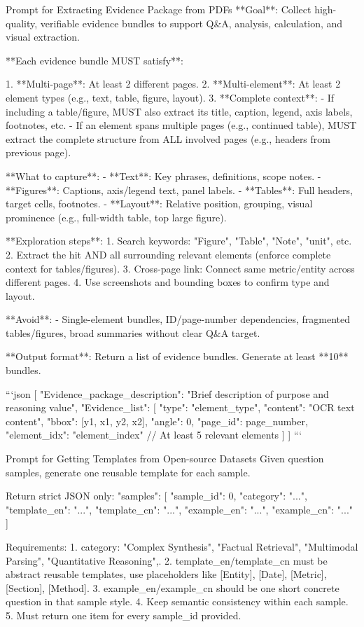 \documentclass[]{opendatalab}
\begin{document}
{{{\begin{promptbox}[breakable]{Prompt for Extracting Evidence Package from PDFs}
**Goal**: Collect high-quality, verifiable evidence bundles to support Q&A, analysis, calculation, and visual extraction.

**Each evidence bundle MUST satisfy**:

1. **Multi-page**: At least 2 different pages.
2. **Multi-element**: At least 2 element types (e.g., text, table, figure, layout).
3. **Complete context**:
 - If including a table/figure, MUST also extract its title, caption, legend, axis labels, footnotes, etc.
 - If an element spans multiple pages (e.g., continued table), MUST extract the complete structure from ALL involved pages (e.g., headers from previous page).

**What to capture**:
- **Text**: Key phrases, definitions, scope notes.
- **Figures**: Captions, axis/legend text, panel labels.
- **Tables**: Full headers, target cells, footnotes.
- **Layout**: Relative position, grouping, visual prominence (e.g., full-width table, top large figure).

**Exploration steps**:
1. Search keywords: "Figure", "Table", "Note", "unit", etc.
2. Extract the hit AND all surrounding relevant elements (enforce complete context for tables/figures).
3. Cross-page link: Connect same metric/entity across different pages.
4. Use screenshots and bounding boxes to confirm type and layout.

**Avoid**:
- Single-element bundles, ID/page-number dependencies, fragmented tables/figures, broad summaries without clear Q&A target.

**Output format**: Return a list of evidence bundles. Generate at least **10** bundles.

```json
[{
 "Evidence_package_description": "Brief description of purpose and reasoning value",
 "Evidence_list": [
 {
 "type": "element_type",
 "content": "OCR text content",
 "bbox": [y1, x1, y2, x2],
 "angle": 0,
 "page_id": page_number,
 "element_idx": "element_index"
 }
 // At least 5 relevant elements
 ]
}]
```
\end{promptbox}

\begin{promptbox}[breakable]{Prompt for Getting Templates from Open-source Datasets}
Given question samples, generate one reusable template for each sample.

Return strict JSON only:
{{
 "samples": [
 {{
 "sample_id": 0,
 "category": "...",
 "template_en": "...",
 "template_cn": "...",
 "example_en": "...",
 "example_cn": "..."
 }}
 ]
}}

Requirements:
1. category: "Complex Synthesis", "Factual Retrieval", "Multimodal Parsing", "Quantitative Reasoning",.
2. template_en/template_cn must be abstract reusable templates, use placeholders like [Entity], [Date], [Metric], [Section], [Method].
3. example_en/example_cn should be one short concrete question in that sample style.
4. Keep semantic consistency within each sample.
5. Must return one item for every sample_id provided.
\end{promptbox}

}}}
\end{document}
